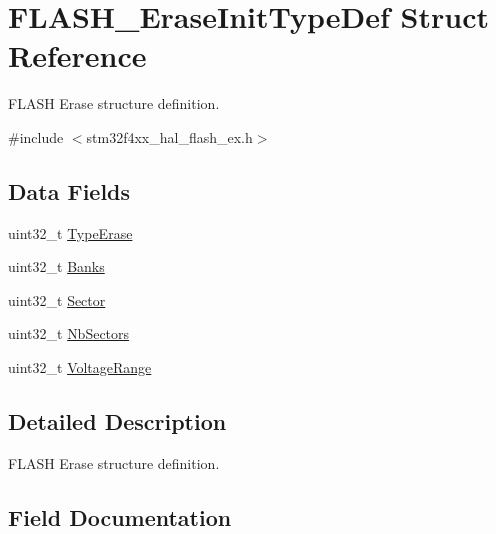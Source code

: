 \hypertarget{struct_f_l_a_s_h___erase_init_type_def}{}\section{F\+L\+A\+S\+H\+\_\+\+Erase\+Init\+Type\+Def Struct Reference}
\label{struct_f_l_a_s_h___erase_init_type_def}


F\+L\+A\+SH Erase structure definition.  




{\ttfamily \#include $<$stm32f4xx\+\_\+hal\+\_\+flash\+\_\+ex.\+h$>$}

\subsection*{Data Fields}
\begin{DoxyCompactItemize}
\item 
uint32\+\_\+t \hyperlink{struct_f_l_a_s_h___erase_init_type_def_a5d08471046a663db76d2252848a7d66c}{Type\+Erase}
\item 
uint32\+\_\+t \hyperlink{struct_f_l_a_s_h___erase_init_type_def_a9590db921fb8d36daf38e097f68fc14f}{Banks}
\item 
uint32\+\_\+t \hyperlink{struct_f_l_a_s_h___erase_init_type_def_a13bac8f9a1ba504a265b44345ecf4d2b}{Sector}
\item 
uint32\+\_\+t \hyperlink{struct_f_l_a_s_h___erase_init_type_def_aec98fec1676cd618e3743158c855a76a}{Nb\+Sectors}
\item 
uint32\+\_\+t \hyperlink{struct_f_l_a_s_h___erase_init_type_def_a3a2a0c2c4ed573bb84c768c6dbb92cc9}{Voltage\+Range}
\end{DoxyCompactItemize}


\subsection{Detailed Description}
F\+L\+A\+SH Erase structure definition. 

\subsection{Field Documentation}
\mbox{\label{struct_f_l_a_s_h___erase_init_type_def_a9590db921fb8d36daf38e097f68fc14f}} 
